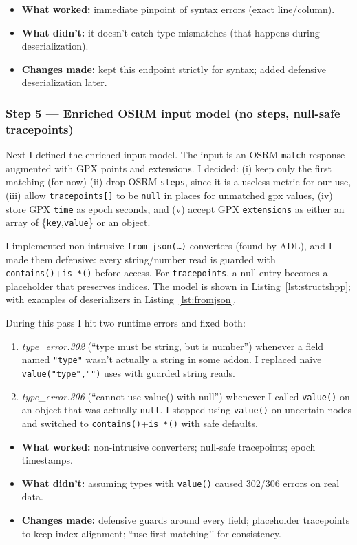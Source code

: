 \documentclass[11pt,twoside]{report}
\begin{document}
\begin{itemize}
	\item \textbf{What worked:} immediate pinpoint of syntax errors (exact line/column).
	\item \textbf{What didn’t:} it doesn’t catch type mismatches (that happens during deserialization).
	\item \textbf{Changes made:} kept this endpoint strictly for syntax; added defensive deserialization later.
\end{itemize}

\subsubsection*{Step 5 — Enriched OSRM input model (no steps, null-safe tracepoints)}
Next I defined the enriched input model. The input is an OSRM \texttt{match} response augmented with GPX points and extensions. I decided:
(i) keep only the first matching (for now)
(ii) drop OSRM \texttt{steps}, since it is a useless metric for our use,
(iii) allow \texttt{tracepoints[]} to be \texttt{null} in places for unmatched gpx values,
(iv) store GPX \texttt{time} as epoch seconds, and
(v) accept GPX \texttt{extensions} as either an array of \{\texttt{key},\texttt{value}\} or an object.

I implemented non-intrusive \texttt{from\_json(\dots)} converters (found by ADL), and I made them defensive: every string/number read is guarded with \texttt{contains()}+\texttt{is\_*()} before access. For \texttt{tracepoints}, a null entry becomes a placeholder that preserves indices. The model is shown in Listing~\ref{lst:structshpp}; with examples of deserializers in Listing~\ref{lst:fromjson}.

During this pass I hit two runtime errors and fixed both:
\begin{enumerate}
	\item \emph{type\_error.302} (``type must be string, but is number'') whenever a field named \texttt{"type"} wasn’t actually a string in some addon. I replaced naive \texttt{value("type","")} uses with guarded string reads.
	\item \emph{type\_error.306} (``cannot use value() with null'') whenever I called \texttt{value()} on an object that was actually \texttt{null}. I stopped using \texttt{value()} on uncertain nodes and switched to \texttt{contains()}+\texttt{is\_*()} with safe defaults.
\end{enumerate}

\begin{itemize}
	\item \textbf{What worked:} non-intrusive converters; null-safe tracepoints; epoch timestamps.
	\item \textbf{What didn’t:} assuming types with \texttt{value()} caused 302/306 errors on real data.
	\item \textbf{Changes made:} defensive guards around every field; placeholder tracepoints to keep index alignment; ``use first matching’’ for consistency.
\end{itemize}
\end{document}
